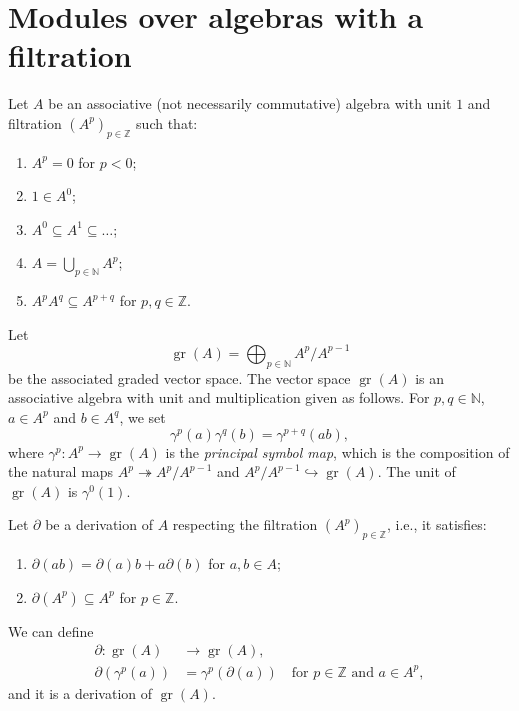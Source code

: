 \documentclass[a4paper, 12pt, reqno]{amsart}
\theoremstyle{remark}
\DeclareMathOperator{\gr}{gr}
\begin{document}
\section{Modules over algebras with a filtration}
\label{sec:modul-over-algebr}

Let $A$ be an associative (not necessarily commutative) algebra with unit $1$ and filtration $(A^p)_{p \in \mathbb{Z}}$ such that:
\begin{enumerate}
\item $A^p = 0$ for $p < 0$;
\item $1 \in A^0$;
\item $A^0 \subseteq A^1 \subseteq \dots$;
\item $A = \bigcup_{p \in \mathbb{N}}A^p$;
\item $A^pA^q \subseteq A^{p + q}$ for $p, q \in \mathbb{Z}$.
\end{enumerate}
Let
\begin{equation*}
  \gr(A) = \bigoplus_{p \in \mathbb{N}}A^p/A^{p - 1}
\end{equation*}
be the associated graded vector space.
The vector space $\gr(A)$ is an associative algebra with unit and multiplication given as follows.
For $p, q \in \mathbb{N}$, $a \in A^p$ and $b \in A^q$, we set
\begin{equation*}
  \gamma^p(a)\gamma^q(b) = \gamma^{p + q}(ab),
\end{equation*}
where $\gamma^p: A^p \to \gr(A)$ is the \emph{principal symbol map}, which is the composition of the natural maps $A^p \twoheadrightarrow A^p/A^{p - 1}$ and $A^p/A^{p - 1} \hookrightarrow \gr(A)$.
The unit of $\gr(A)$ is $\gamma^0(1)$.

Let $\partial$ be a derivation of $A$ respecting the filtration $(A^p)_{p \in \mathbb{Z}}$, i.e., it satisfies:
\begin{enumerate}
\item $\partial(ab) = \partial(a)b + a\partial(b)$ for $a, b \in A$;
\item $\partial(A^p) \subseteq A^p$ for $p \in \mathbb{Z}$.
\end{enumerate}
We can define
\begin{align*}
  \partial: \gr(A) &\to \gr(A), \\
  \partial(\gamma^p(a)) &= \gamma^p(\partial(a)) \quad \text{for $p \in \mathbb{Z}$ and $a \in A^p$},
\end{align*}
and it is a derivation of $\gr(A)$.
\end{document}
